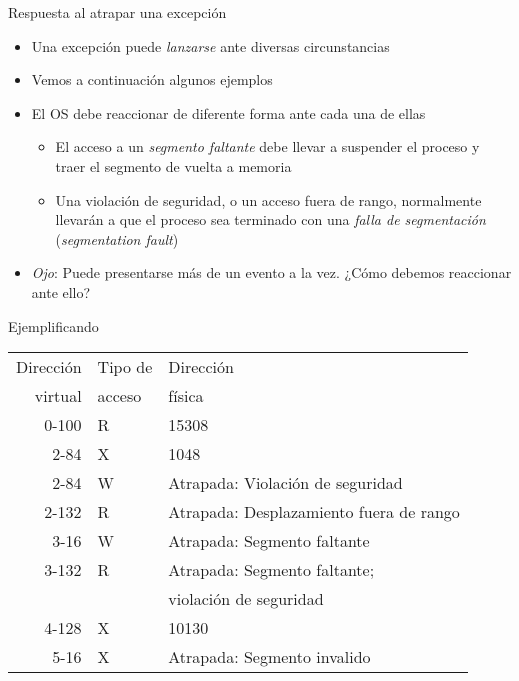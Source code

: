 \documentclass[presentation]{beamer}
\begin{document}
\begin{frame}[label={sec:org77610b3}]{Respuesta al atrapar una excepción}
\begin{itemize}
\item Una excepción puede \emph{lanzarse} ante diversas circunstancias
\item Vemos a continuación algunos ejemplos
\item El OS debe reaccionar de diferente forma ante cada una de ellas
\begin{itemize}
\item El acceso a un \emph{segmento faltante} debe llevar a suspender el
proceso y traer el segmento de vuelta a memoria
\item Una violación de seguridad, o un acceso fuera de rango,
normalmente llevarán a que el proceso sea terminado con una
\emph{falla de segmentación} (\emph{segmentation fault})
\end{itemize}
\item \emph{Ojo}: Puede presentarse más de un evento a la vez. ¿Cómo debemos
reaccionar ante ello?
\end{itemize}
\end{frame}

\begin{frame}[label={sec:org3d822e7}]{Ejemplificando}
\begin{center}
\begin{tabular}{rll}
Dirección & Tipo de & Dirección\\
virtual & acceso & física\\
\hline
0-100 & R & 15308\\
2-84 & X & 1048\\
2-84 & W & Atrapada: Violación de seguridad\\
2-132 & R & Atrapada: Desplazamiento fuera de rango\\
3-16 & W & Atrapada: Segmento faltante\\
3-132 & R & Atrapada: Segmento faltante;\\
 &  & violación de seguridad\\
4-128 & X & 10130\\
5-16 & X & Atrapada: Segmento invalido\\
\end{tabular}
\end{center}
\end{frame}
\end{document}

